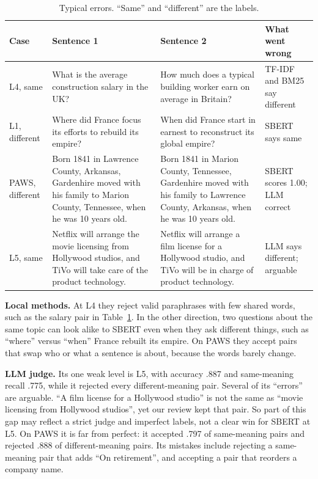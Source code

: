 \documentclass[11pt]{article}
\begin{document}
\begin{table}[t]
\centering\small
\setlength{\tabcolsep}{4pt}
\begin{tabular}{@{}p{1.6cm}p{5.6cm}p{5.6cm}p{2.4cm}@{}}
\toprule
\textbf{Case} & \textbf{Sentence 1} & \textbf{Sentence 2} & \textbf{What went wrong} \\
\midrule
L4, same & What is the average construction salary in the UK? & How much does a typical building worker earn on average in Britain? & TF-IDF and BM25 say different \\
L1, different & Where did France focus its efforts to rebuild its empire? & When did France start in earnest to reconstruct its global empire? & SBERT says same \\
PAWS, different & Born 1841 in Lawrence County, Arkansas, Gardenhire moved with his family to Marion County, Tennessee, when he was 10 years old. & Born 1841 in Marion County, Tennessee, Gardenhire moved with his family to Lawrence County, Arkansas, when he was 10 years old. & SBERT scores 1.00; LLM correct \\
L5, same & Netflix will arrange the movie licensing from Hollywood studios, and TiVo will take care of the product technology. & Netflix will arrange a film license for a Hollywood studio, and TiVo will be in charge of product technology. & LLM says different; arguable \\
\bottomrule
\end{tabular}
\caption{Typical errors. “Same” and “different” are the labels.}
\label{tab:fail}
\end{table}

\textbf{Local methods.} At L4 they reject valid paraphrases with few shared words, such as the salary pair in Table~\ref{tab:fail}. In the other direction, two questions about the same topic can look alike to SBERT even when they ask different things, such as “where” versus “when” France rebuilt its empire. On PAWS they accept pairs that swap who or what a sentence is about, because the words barely change.

\textbf{LLM judge.} Its one weak level is L5, with accuracy .887 and same-meaning recall .775, while it rejected every different-meaning pair. Several of its “errors” are arguable. “A film license for a Hollywood studio” is not the same as “movie licensing from Hollywood studios”, yet our review kept that pair. So part of this gap may reflect a strict judge and imperfect labels, not a clear win for SBERT at L5. On PAWS it is far from perfect: it accepted .797 of same-meaning pairs and rejected .888 of different-meaning pairs. Its mistakes include rejecting a same-meaning pair that adds “On retirement”, and accepting a pair that reorders a company name.
\end{document}
